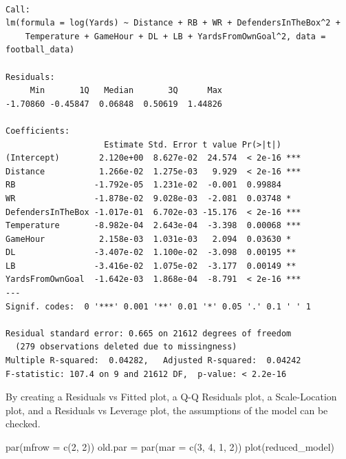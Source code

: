 \documentclass[
  super,
  preprint,
  3p]{elsarticle}
\newenvironment{Shaded}{\begin{snugshade}}{\end{snugshade}}
\newcommand{\AttributeTok}[1]{\textcolor[rgb]{0.40,0.45,0.13}{#1}}
\newcommand{\DecValTok}[1]{\textcolor[rgb]{0.68,0.00,0.00}{#1}}
\newcommand{\FunctionTok}[1]{\textcolor[rgb]{0.28,0.35,0.67}{#1}}
\newcommand{\NormalTok}[1]{\textcolor[rgb]{0.00,0.23,0.31}{#1}}
\newcommand{\OtherTok}[1]{\textcolor[rgb]{0.00,0.23,0.31}{#1}}
\begin{document}
\begin{verbatim}

Call:
lm(formula = log(Yards) ~ Distance + RB + WR + DefendersInTheBox^2 + 
    Temperature + GameHour + DL + LB + YardsFromOwnGoal^2, data = football_data)

Residuals:
     Min       1Q   Median       3Q      Max 
-1.70860 -0.45847  0.06848  0.50619  1.44826 

Coefficients:
                    Estimate Std. Error t value Pr(>|t|)    
(Intercept)        2.120e+00  8.627e-02  24.574  < 2e-16 ***
Distance           1.266e-02  1.275e-03   9.929  < 2e-16 ***
RB                -1.792e-05  1.231e-02  -0.001  0.99884    
WR                -1.878e-02  9.028e-03  -2.081  0.03748 *  
DefendersInTheBox -1.017e-01  6.702e-03 -15.176  < 2e-16 ***
Temperature       -8.982e-04  2.643e-04  -3.398  0.00068 ***
GameHour           2.158e-03  1.031e-03   2.094  0.03630 *  
DL                -3.407e-02  1.100e-02  -3.098  0.00195 ** 
LB                -3.416e-02  1.075e-02  -3.177  0.00149 ** 
YardsFromOwnGoal  -1.642e-03  1.868e-04  -8.791  < 2e-16 ***
---
Signif. codes:  0 '***' 0.001 '**' 0.01 '*' 0.05 '.' 0.1 ' ' 1

Residual standard error: 0.665 on 21612 degrees of freedom
  (279 observations deleted due to missingness)
Multiple R-squared:  0.04282,   Adjusted R-squared:  0.04242 
F-statistic: 107.4 on 9 and 21612 DF,  p-value: < 2.2e-16
\end{verbatim}

By creating a Residuals vs Fitted plot, a Q-Q Residuals plot, a
Scale-Location plot, and a Residuals vs Leverage plot, the assumptions
of the model can be checked.

\begin{Shaded}
\begin{Highlighting}[]
\FunctionTok{par}\NormalTok{(}\AttributeTok{mfrow =} \FunctionTok{c}\NormalTok{(}\DecValTok{2}\NormalTok{, }\DecValTok{2}\NormalTok{))}
\NormalTok{old.par }\OtherTok{=} \FunctionTok{par}\NormalTok{(}\AttributeTok{mar =} \FunctionTok{c}\NormalTok{(}\DecValTok{3}\NormalTok{, }\DecValTok{4}\NormalTok{, }\DecValTok{1}\NormalTok{, }\DecValTok{2}\NormalTok{))}
\FunctionTok{plot}\NormalTok{(reduced\_model)}
\end{Highlighting}
\end{Shaded}
\end{document}
